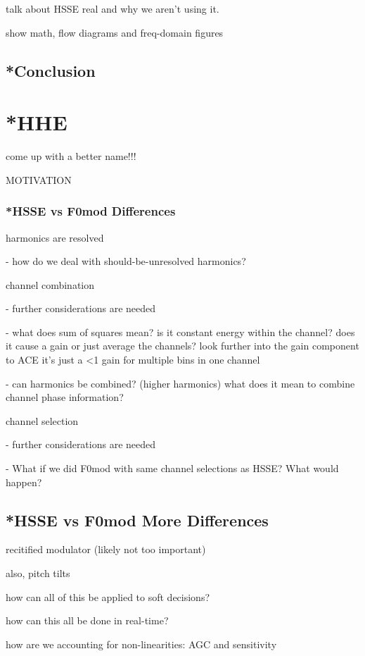 \documentclass [11pt, proquest] {uwthesis}[2015/03/03]
\begin{document}
talk about HSSE real{} and why we aren't using it.

show math, flow diagrams and freq-domain figures

\section{*Conclusion}



\chapter{*HHE}
come up with a better name!!!

MOTIVATION

\subsection{*HSSE vs F0mod Differences}

harmonics are resolved

 - how do we deal with should-be-unresolved harmonics?

channel combination

 - further considerations are needed

 - what does sum of squares mean? is it constant energy within the channel?  does it cause a gain or just average the channels?  look further into the gain component to ACE
 	it's just a <1 gain for multiple bins in one channel

 - can harmonics be combined? (higher harmonics) what does it mean to combine channel phase information?

channel selection

 - further considerations are needed

 - What if we did F0mod with same channel selections as HSSE?  What would happen?

\section{*HSSE vs F0mod More Differences}

recitified modulator (likely not too important)

also, pitch tilts

how can all of this be applied to soft decisions?

how can this all be done in real-time?

how are we accounting for non-linearities: AGC and sensitivity
\end{document}
